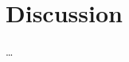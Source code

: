 
\chapter{Discussion} %



\ifpdf
    \graphicspath{{7/figures/PNG/}{7/figures/PDF/}{7/figures/}}
\else
    \graphicspath{{7/figures/EPS/}{7/figures/}}
\fi


% 

\dots



